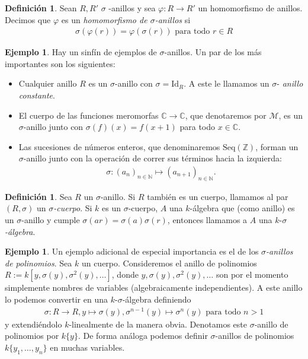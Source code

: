 \documentclass[letterpaper]{article}
\def\N{\mathbb{N}}
\def\Z{\mathbb{Z}}
\def\C{\mathbb{C}}
\def\fa{\text{ para todo }}
\def\Id{\text{Id}}
\theoremstyle{definition}
\newtheorem{ex}[Satz]{Ejemplo}
\newtheorem{defn}[Satz]{Definici\'on}
\begin{document}
\begin{defn}
Sean $R, R'$  $\sigma$ -anillos y sea $\varphi: R \rightarrow R'$ un homomorfismo de anillos. Decimos que $\varphi$ es un \emph{homomorfismo de $\sigma$-anillos}  si 
\begin{align*}
\sigma(\varphi(r)) = \varphi(\sigma(r)) \fa r \in R
\end{align*}
\end{defn}

\begin{ex} Hay un sinf\'in de ejemplos de $\sigma$-anillos. Un par de los m\'as importantes son los siguientes:

\begin{itemize}
\item Cualquier anillo $R$ es un $\sigma$-anillo con $\sigma = \Id_R$. A este le llamamos un $\sigma$- \emph{anillo constante}.
\item El cuerpo de las funciones meromorfas $\C \rightarrow \C$, que denotaremos por $\mathcal{M}$,
 es un $\sigma$-anillo junto con $\sigma(f)(x) = f(x+1)$ para todo $x \in \C$.
\item Las sucesiones de n\'umeros enteros, que denominaremos $\text{Seq}(\Z)$, forman un $\sigma$-anillo junto con la operaci\'on de correr sus t\'erminos hacia la izquierda:
\begin{align*} \sigma: (a_n)_{n \in \N} \mapsto (a_{n+1})_{n \in \N}. \end{align*}
\end{itemize}
\end{ex}

\begin{defn}
Sea $R$ un $\sigma$-anillo. Si $R$ tambi\'en es un cuerpo, llamamos al par $(R,\sigma)$ un $\sigma$\emph{-cuerpo}. 
Si $k$ es un $\sigma$-cuerpo, $A$ una $k$-\'algebra que (como anillo) es un $\sigma$-anillo y cumple
$\sigma(ar) = \sigma(a) \sigma(r)$, entonces llamamos a $A$ una  $k$-$\sigma$\emph{-\'algebra}.
\end{defn}

\begin{ex}
Un ejemplo adicional de especial importancia es el de los $\sigma$\emph{-anillos de polinomios}.
Sea $k$ un cuerpo. Consideremos el anillo de polinomios $R:= k[y,\sigma(y),\sigma^2(y),\ldots]$,
 donde $y,\sigma(y),\sigma^2(y),\ldots$ son por el momento simplemente nombres de variables (algebraicamente independientes).
A este anillo lo podemos convertir en una $k$-$\sigma$-\'algebra definiendo 
\begin{align*} 
\sigma:  R \rightarrow R, y \mapsto \sigma(y), \sigma^{n-1}(y) \mapsto \sigma^{n}(y) \fa n > 1 
\end{align*}
y extendi\'endolo $k$-linealmente de la manera obvia. Denotamos este $\sigma$-anillo de polinomios por $k\{y\}$. De forma an\'aloga podemos definir $\sigma$-anillos de polinomios $k\{y_1, \ldots, y_n \}$ en muchas variables.
\end{ex}
\end{document}
